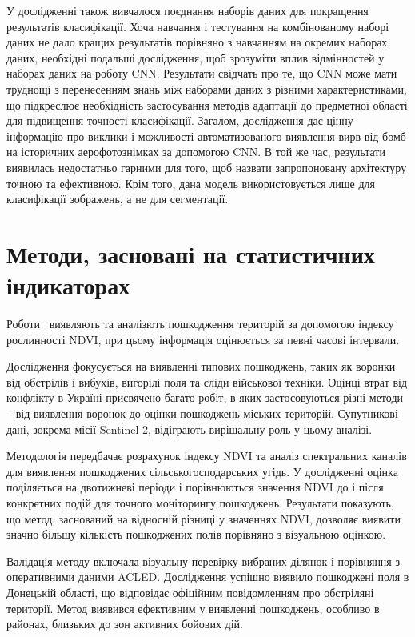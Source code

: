 У дослідженні також вивчалося поєднання наборів
даних для покращення результатів класифікації. Хоча навчання
і тестування на комбінованому наборі даних не дало кращих
результатів порівняно з навчанням на окремих наборах даних,
необхідні подальші дослідження, щоб зрозуміти вплив відмінностей
у наборах даних на роботу CNN. Результати свідчать про те,
що CNN може мати труднощі з перенесенням знань між наборами
даних з різними характеристиками, що підкреслює необхідність
застосування методів адаптації до предметної області для
підвищення точності класифікації. Загалом, дослідження дає
цінну інформацію про виклики і можливості автоматизованого
виявлення вирв від бомб на історичних аерофотознімках за
допомогою CNN. В той же час, результати виявилась недостатньо
гарними для того, щоб назвати запропоновану архітектуру
точною та ефективною. Крім того, дана модель використовується
лише для класифікації зображень, а не для сегментації.

\section{Методи, засновані на статистичних індикаторах}

Роботи~\cite{mikava2023,shelestov2023} виявляють та аналізють пошкодження
територій за допомогою
індексу рослинності NDVI, при цьому інформація оцінюється
за певні часові інтервали.

Дослідження фокусується на виявленні типових пошкоджень,
таких як воронки від обстрілів і вибухів, вигорілі поля
та сліди військової техніки. Оцінці втрат від конфлікту в
Україні присвячено багато робіт, в яких застосовуються
різні методи -- від виявлення воронок до оцінки пошкоджень
міських територій. Супутникові дані, зокрема місії
Sentinel-2, відіграють вирішальну роль у цьому аналізі.

Методологія передбачає розрахунок
індексу NDVI та аналіз спектральних каналів для виявлення
пошкоджених сільськогосподарських угідь. У дослідженні
оцінка поділяється на двотижневі періоди і порівнюються
значення NDVI до і після конкретних подій для точного
моніторингу пошкоджень. Результати показують, що метод,
заснований на відносній різниці у значеннях NDVI, дозволяє
виявити значно більшу кількість пошкоджених полів порівняно
з візуальною оцінкою.

Валідація методу включала візуальну перевірку вибраних
ділянок і порівняння з оперативними даними ACLED.
Дослідження успішно виявило пошкоджені поля в Донецькій області,
що відповідає офіційним повідомленням про обстріляні території.
Метод виявився ефективним у виявленні пошкоджень, особливо
в районах, близьких до зон активних бойових дій.

